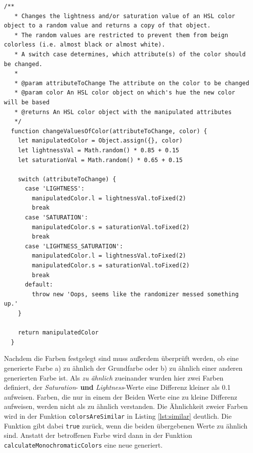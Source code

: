 \begin{lstlisting}[caption=Setzen der HSL-Werte, label=lst:hsl]
  /**
   * Changes the lightness and/or saturation value of an HSL color object to a random value and returns a copy of that object.
   * The random values are restricted to prevent them from beign colorless (i.e. almost black or almost white).
   * A switch case determines, which attribute(s) of the color should be changed.
   *
   * @param attributeToChange The attribute on the color to be changed
   * @param color An HSL color object on which's hue the new color will be based
   * @returns An HSL color object with the manipulated attributes
   */
  function changeValuesOfColor(attributeToChange, color) {
    let manipulatedColor = Object.assign({}, color)
    let lightnessVal = Math.random() * 0.85 + 0.15
    let saturationVal = Math.random() * 0.65 + 0.15

    switch (attributeToChange) {
      case 'LIGHTNESS':
        manipulatedColor.l = lightnessVal.toFixed(2)
        break
      case 'SATURATION':
        manipulatedColor.s = saturationVal.toFixed(2)
        break
      case 'LIGHTNESS_SATURATION':
        manipulatedColor.l = lightnessVal.toFixed(2)
        manipulatedColor.s = saturationVal.toFixed(2)
        break
      default:
        throw new 'Oops, seems like the randomizer messed something up.'
    }

    return manipulatedColor
  }
\end{lstlisting}

Nachdem die Farben festgelegt sind muss außerdem überprüft werden, ob  eine generierte Farbe a) zu ähnlich der Grundfarbe oder b) zu ähnlich einer anderen generierten Farbe ist.
Als \textit{zu ähnlich} zueinander wurden hier zwei Farben definiert, der \textit{Saturation}- \textbf{und} \textit{Lightness}-Werte eine Differenz kleiner als 0.1 aufweisen. Farben, die nur in einem der Beiden Werte eine zu kleine Differenz aufweisen, werden nicht als zu ähnlich verstanden.
Die Ähnlichkeit zweier Farben wird in  der Funktion \verb|colorsAreSimilar| in Listing \ref{lst:similar} deutlich. Die Funktion gibt dabei \verb|true| zurück, wenn die beiden übergebenen Werte zu ähnlich sind. Anstatt der betroffenen Farbe wird dann in der Funktion \verb|calculateMonochromaticColors| eine neue generiert.

